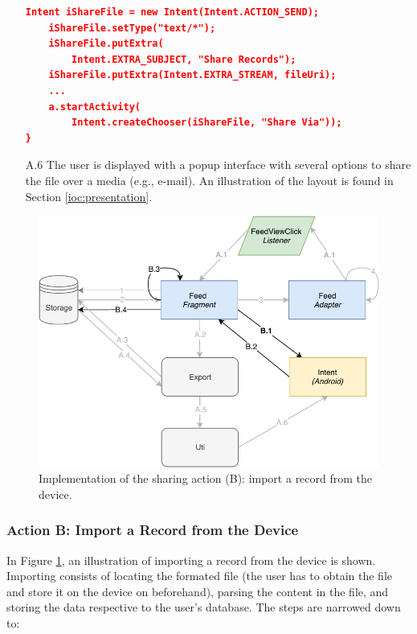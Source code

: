 \begin{itemize}
\begin{lstlisting}[language=json, caption={}, captionpos=b]
    Intent iShareFile = new Intent(Intent.ACTION_SEND);
    iShareFile.setType("text/*");
    iShareFile.putExtra(
        Intent.EXTRA_SUBJECT, "Share Records");
    iShareFile.putExtra(Intent.EXTRA_STREAM, fileUri);
    ...
    a.startActivity(
        Intent.createChooser(iShareFile, "Share Via"));
}

\end{lstlisting}

    \item[A.6] The user is displayed with a popup interface with several options to share the file over a media (e.g., e-mail). An illustration of the layout is found in Section \ref{ioc:presentation}. 


\end{itemize}


\begin{figure}
    \centering
    \includegraphics[scale=0.7]{images/Sharing_ImpB.pdf}
    \caption{Implementation of the sharing action (B): import a record from the device.}
    \label{fig:impl_sharingB}
\end{figure}

\subsubsection{Action B: Import a Record from the Device}
In Figure \ref{fig:impl_sharingB}, an illustration of importing a record from the device is shown. Importing consists of locating the formated file (the user has to obtain the file and store it on the device on beforehand), parsing the content in the file, and storing the data respective to the user's database. The steps are narrowed down to:

